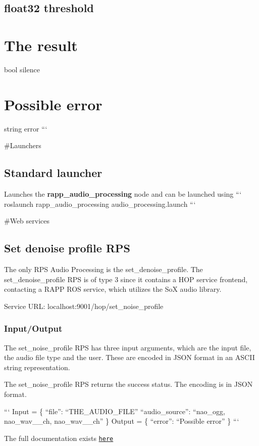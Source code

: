 \subsection*{float32 threshold }

\section*{The result}

bool silence \section*{Possible error}

string error ```

\#\-Launchers

\subsection*{Standard launcher}

Launches the {\bfseries rapp\-\_\-audio\-\_\-processing} node and can be launched using ``` roslaunch rapp\-\_\-audio\-\_\-processing audio\-\_\-processing.\-launch ```

\#\-Web services

\subsection*{Set denoise profile R\-P\-S}

The only R\-P\-S Audio Processing is the set\-\_\-denoise\-\_\-profile. The set\-\_\-denoise\-\_\-profile R\-P\-S is of type 3 since it contains a H\-O\-P service frontend, contacting a R\-A\-P\-P R\-O\-S service, which utilizes the So\-X audio library.

Service U\-R\-L\-: {\ttfamily localhost\-:9001/hop/set\-\_\-noise\-\_\-profile}

\subsubsection*{Input/\-Output}

The set\-\_\-noise\-\_\-profile R\-P\-S has three input arguments, which are the input file, the audio file type and the user. These are encoded in J\-S\-O\-N format in an A\-S\-C\-I\-I string representation.

The set\-\_\-noise\-\_\-profile R\-P\-S returns the success status. The encoding is in J\-S\-O\-N format.

``` Input = \{ “file”\-: “\-T\-H\-E\-\_\-\-A\-U\-D\-I\-O\-\_\-\-F\-I\-L\-E” “audio\-\_\-source”\-: “nao\-\_\-ogg, nao\-\_\-wav\-\_\-\_\-ch, nao\-\_\-wav\-\_\-\_\-ch” \} {\ttfamily  } Output = \{ “error”\-: “\-Possible error” \} ```

The full documentation exists \href{https://github.com/rapp-project/rapp-platform/tree/master/rapp_web_services/services#set-noise-profile}{\tt here} 